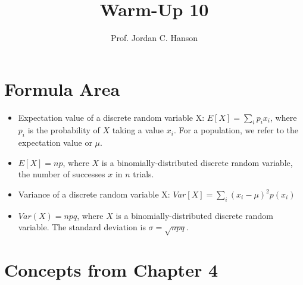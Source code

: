 \documentclass{article}
\begin{document}
\title{Warm-Up 10}
\author{Prof. Jordan C. Hanson}

\maketitle

\section{Formula Area}

\begin{itemize}
\item Expectation value of a discrete random variable X: $E[X] = \sum_i p_i x_i$, where $p_i$ is the probability of $X$ taking a value $x_i$.  For a population, we refer to the expectation value or $\mu$.
\item $E[X] = n p$, where $X$ is a binomially-distributed discrete random variable, the number of successes $x$ in $n$ trials.
\item Variance of a discrete random variable X: $Var[X] = \sum_i (x_i - \mu)^2 p(x_i)$
\item $Var(X) = n p q$, where $X$ is a binomially-distributed discrete random variable.  The standard deviation is $\sigma = \sqrt{npq}$.
\end{itemize}

\section{Concepts from Chapter 4}
\end{document}
